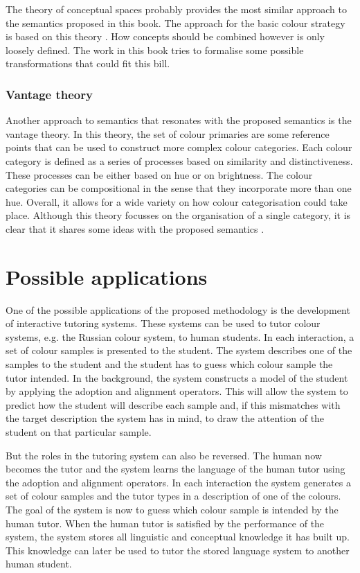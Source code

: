 The theory of conceptual spaces probably provides the most similar
approach to the semantics proposed in this book. The approach for
the basic colour strategy is based on this theory
\citep{gardenfors04conceptual}. How concepts should be combined
however is only loosely defined. The work in this book tries to
formalise some possible transformations that could fit this bill.

\subsubsection{Vantage theory}

Another approach to semantics that resonates with the proposed
semantics is the vantage theory. In this theory, the set of colour
primaries are some reference points that can be used to construct more
complex colour categories. Each colour category is defined as a series
of processes based on similarity and distinctiveness. These processes
can be either based on hue or on brightness. The colour categories can
be compositional in the sense that they incorporate more than one
hue. Overall, it allows for a wide variety on how colour
categorisation could take place. Although this theory focusses on the
organisation of a single category, it is clear that it shares some
ideas with the proposed semantics \citep{maclaury92brightness,
  maclaury02introducing}.

\section{Possible applications}
\label{s:possible-applications}

One of the possible applications of the proposed methodology is the
development of interactive tutoring systems. These systems can be used
to tutor colour systems, e.g. the Russian colour system,
to human students. In each interaction, a set of colour samples is
presented to the student. The system describes one of the samples to
the student and the student has to guess which colour sample the tutor
intended. In the background, the system constructs a model of the
student by applying the adoption and alignment operators. This will
allow the system to predict how the student will describe each sample
and, if this mismatches with the target description the system has in
mind, to draw the attention of the student on that particular sample.

But the roles in the tutoring system can also be reversed. The human
now becomes the tutor and the system learns the language of the human
tutor using the adoption and alignment operators. In each interaction
the system generates a set of colour samples and the tutor types in a
description of one of the colours. The goal of the system is now to
guess which colour sample is intended by the human tutor. When the
human tutor is satisfied by the performance of the system, the system
stores all linguistic and conceptual knowledge it has built up. This
knowledge can later be used to tutor the stored language system to
another human student.

